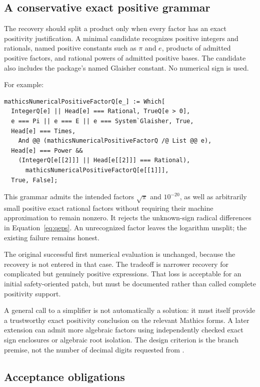 \documentclass[11pt,letterpaper]{article}
\newcommand{\code}[1]{\texttt{\detokenize{#1}}}
\begin{document}
\subsection{A conservative exact positive grammar}

The recovery should split a product only when every factor has an exact positivity justification. A minimal candidate recognizes positive integers and rationals, named positive constants such as $\pi$ and $e$, products of admitted positive factors, and rational powers of admitted positive bases. The candidate also includes the package's named Glaisher constant. No numerical sign is used.

For example:
\begin{lstlisting}
mathicsNumericalPositiveFactorQ[e_] := Which[
  IntegerQ[e] || Head[e] === Rational, TrueQ[e > 0],
  e === Pi || e === E || e === System`Glaisher, True,
  Head[e] === Times,
    And @@ (mathicsNumericalPositiveFactorQ /@ List @@ e),
  Head[e] === Power &&
    (IntegerQ[e[[2]]] || Head[e[[2]]] === Rational),
      mathicsNumericalPositiveFactorQ[e[[1]]],
  True, False];
\end{lstlisting}

This grammar admits the intended factors $\sqrt\pi$ and $10^{-20}$, as well as arbitrarily small positive exact rational factors without requiring their machine approximation to remain nonzero. It rejects the unknown-sign radical differences in Equation~\eqref{eq:qeps}. An unrecognized factor leaves the logarithm unsplit; the existing failure remains honest.

The original successful first numerical evaluation is unchanged, because the recovery is not entered in that case. The tradeoff is narrower recovery for complicated but genuinely positive expressions. That loss is acceptable for an initial safety-oriented patch, but must be documented rather than called complete positivity support.

A general call to a simplifier is not automatically a solution: it must itself provide a trustworthy exact positivity conclusion on the relevant Mathics forms. A later extension can admit more algebraic factors using independently checked exact sign enclosures or algebraic root isolation. The design criterion is the branch premise, not the number of decimal digits requested from \code{N}.

\subsection{Acceptance obligations}
\end{document}
